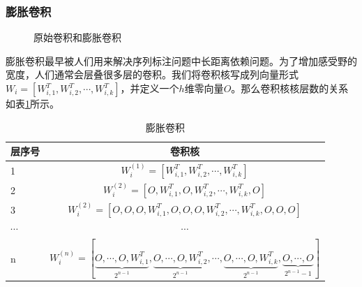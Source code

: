 \documentclass[twoside,a4paper,12pt]{book}%
\begin{document}
\subsubsection{膨胀卷积}
\begin{figure}[htbp]
\centering
{}
\caption{原始卷积和膨胀卷积}
\end{figure}
膨胀卷积最早被人们用来解决序列标注问题中长距离依赖问题。为了增加感受野的宽度，人们通常会层叠很多层的卷积。我们将卷积核写成列向量形式$W_i=[W_{i,1}^T,W_{i,2}^T,\cdots,W_{i,k}^T]$，并定义一个$h$维零向量$O$。那么卷积核核层数的关系如表\ref{tab:idcnn}所示。
\begin{table} [h]
    \caption{膨胀卷积}
	\label{tab:idcnn}
	\centering
    \begin{tabular}{l|c}  %
        \hline    
        层序号&卷积核\\
        \hline    
        1&$W_i^{(1)}=[W_{i,1}^T,W_{i,2}^T,\cdots,W_{i,k}^T]$\\
        \hline                      %
        2&$W_i^{(2)}=[O,W_{i,1}^T,O,W_{i,2}^T,\cdots,W_{i,k}^T,O]$ \\  
        \hline  
        3&$W_i^{(2)}=[O,O,O,W_{i,1}^T,O,O,O,W_{i,2}^T,\cdots,W_{i,k}^T,O,O,O]$ \\  
        \hline
        $\cdots$ & $\cdots$ \\
        \hline
        n&$W_i^{(n)}=[\underbrace{O,\cdots,O,W_{i,1}^T}_{2^{n-1}},
        \underbrace{O,\cdots,O,W_{i,2}^T}_{2^{n-1}},
        \cdots,
        \underbrace{O,\cdots,O,W_{i,k}^T}_{2^{n-1}},
        \underbrace{O,\cdots,O}_{2^{n-1}-1}]$ \\  
        \hline
    \end{tabular}
\end{table}  
\end{document}
